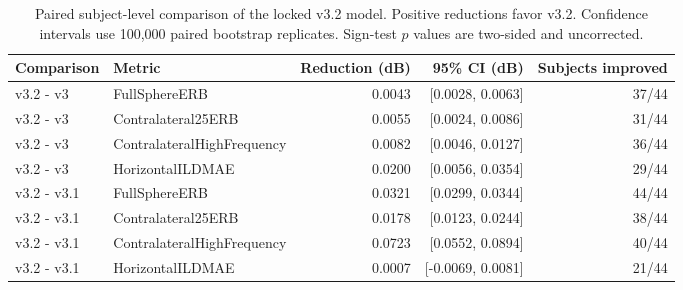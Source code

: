 \begin{table}[t]
\centering
\caption{Paired subject-level comparison of the locked v3.2 model. Positive reductions favor v3.2. Confidence intervals use 100,000 paired bootstrap replicates. Sign-test $p$ values are two-sided and uncorrected.}
\label{tab:sonicom-paired}
\begin{tabular}{llrrr}
\toprule
Comparison & Metric & Reduction (dB) & 95\% CI (dB) & Subjects improved \\
\midrule
v3.2 - v3 & FullSphereERB & 0.0043 & [0.0028, 0.0063] & 37/44 \\
v3.2 - v3 & Contralateral25ERB & 0.0055 & [0.0024, 0.0086] & 31/44 \\
v3.2 - v3 & ContralateralHighFrequency & 0.0082 & [0.0046, 0.0127] & 36/44 \\
v3.2 - v3 & HorizontalILDMAE & 0.0200 & [0.0056, 0.0354] & 29/44 \\
v3.2 - v3.1 & FullSphereERB & 0.0321 & [0.0299, 0.0344] & 44/44 \\
v3.2 - v3.1 & Contralateral25ERB & 0.0178 & [0.0123, 0.0244] & 38/44 \\
v3.2 - v3.1 & ContralateralHighFrequency & 0.0723 & [0.0552, 0.0894] & 40/44 \\
v3.2 - v3.1 & HorizontalILDMAE & 0.0007 & [-0.0069, 0.0081] & 21/44 \\
\bottomrule
\end{tabular}
\end{table}
